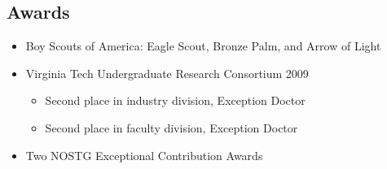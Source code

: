 \documentclass[line,margin]{res}
\begin{document}
\begin{resume}
\section{Awards}
\begin{itemize}[noitemsep]  
\itemsep -2pt %
\setlength{\itemindent}{-1.5em} %
\item Boy Scouts of America: Eagle Scout, Bronze Palm, and Arrow of Light
\item Virginia Tech Undergraduate Research Consortium 2009
\begin{itemize}[noitemsep]
\setlength{\itemindent}{-2em}
\itemsep -2pt
\item Second place in industry division, Exception Doctor
\item Second place in faculty division, Exception Doctor 
\end{itemize}
\item Two NOSTG Exceptional Contribution Awards
\end{itemize}
\end{resume}
\end{document}
